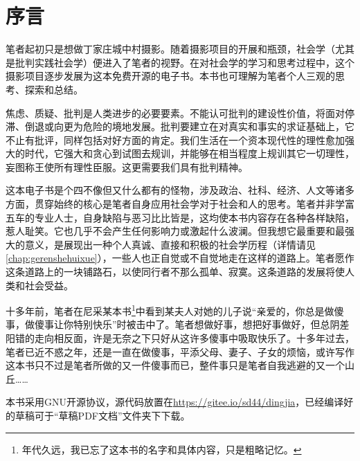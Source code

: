 \chapter{序言}
\label{chap:preface}

笔者起初只是想做丁家庄城中村摄影。随着摄影项目的开展和瓶颈，社会学（尤其是批判实践社会学）便进入了笔者的视野。在对社会学的学习和思考过程中，这个摄影项目逐步发展为这本免费开源的电子书。本书也可理解为笔者个人三观的思考、探索和总结。

焦虑、质疑、批判是人类进步的必要要素。不能认可批判的建设性价值，将面对停滞、倒退或向更为危险的境地发展。批判要建立在对真实和事实的求证基础上，它不止有批评，同样包括对好方面的肯定。我们生活在一个资本现代性的理性愈加强大的时代，它强大和贪心到试图去规训，并能够在相当程度上规训其它一切理性，妄图称王使所有理性臣服。这更需要我们具有批判精神。

这本电子书是个四不像但又什么都有的怪物，涉及政治、社科、经济、人文等诸多方面，贯穿始终的核心是笔者自身应用社会学对于社会和人的思考。笔者并非学富五车的专业人士，自身缺陷与恶习比比皆是，这均使本书内容存在各种各样缺陷，惹人耻笑。它也几乎不会产生任何影响力或激起什么波澜。但我想它最重要和最强大的意义，是展现出一种个人真诚、直接和积极的社会学历程（详情请见\cref{chap:gerenshehuixue}），一些人也正自觉或不自觉地走在这样的道路上。笔者愿作这条道路上的一块铺路石，以使同行者不那么孤单、寂寞。这条道路的发展将使人类和社会受益。

十多年前，笔者在尼采某本书\footnote{年代久远，我已忘了这本书的名字和具体内容，只是粗略记忆。}中看到某夫人对她的儿子说“亲爱的，你总是做傻事，做傻事让你特别快乐”时被击中了。笔者想做好事，想把好事做好，但总阴差阳错的走向相反面，许是无奈之下只好从这许多傻事中吸取快乐了。十多年过去，笔者已近不惑之年，还是一直在做傻事，平添父母、妻子、子女的烦恼，或许写作这本书只不过是笔者所做的又一件傻事而已，整件事只是笔者自我逃避的又一个山丘……



本书采用GNU开源协议，源代码放置在\url{https://gitee.io/sd44/dingjia}，已经编译好的草稿可于“草稿PDF文档”文件夹下下载。


